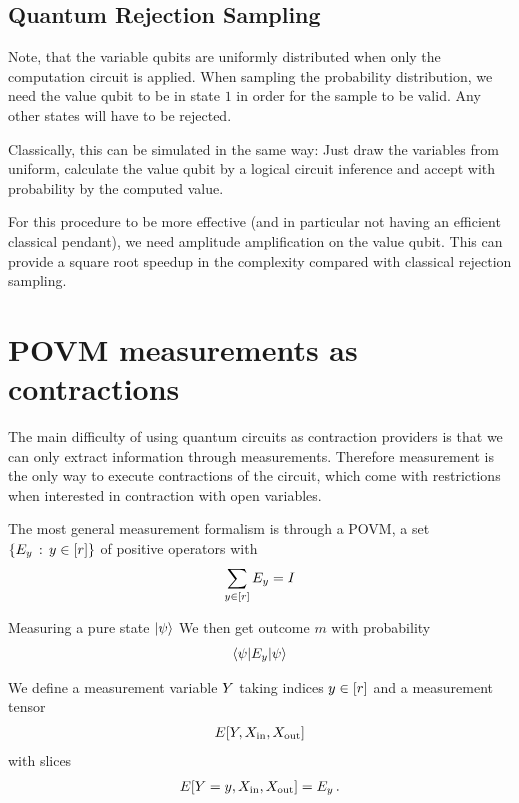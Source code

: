\documentclass[aps,onecolumn,nofootinbib,pra]{article}
\begin{document}
    \subsection{Quantum Rejection Sampling}

    Note, that the variable qubits are uniformly distributed when only the computation circuit is applied.
    When sampling the probability distribution, we need the value qubit to be in state $1$ in order for the sample to be valid.
    Any other states will have to be rejected.

    Classically, this can be simulated in the same way: Just draw the variables from uniform, calculate the value qubit by a logical circuit inference and accept with probability by the computed value.

    For this procedure to be more effective (and in particular not having an efficient classical pendant), we need amplitude amplification on the value qubit.
    This can provide a square root speedup in the complexity compared with classical rejection sampling.


    \section{POVM measurements as contractions}

    The main difficulty of using quantum circuits as contraction providers is that we can only extract information through measurements.
    Therefore measurement is the only way to execute contractions of the circuit, which come with restrictions when interested in contraction with open variables.

    The most general measurement formalism is through a POVM, a set $\{E_y \, : \, y\in[r]\}$ of positive operators with %
    \begin{align*}
        \sum_{y\in[r]} E_y = I
    \end{align*}

    Measuring a pure state $\ket{\psi}$ We then get outcome $m$ with probability
    \begin{align*}
        \braket{\psi|E_y|\psi}
    \end{align*}

    We define a measurement variable $Y$ taking indices $y\in[r]$ and a measurement tensor
    \begin{align*}
        E[Y,X_{\mathrm{in}},X_{\mathrm{out}}]
    \end{align*}
    with slices
    \begin{align*}
        E[Y=y,X_{\mathrm{in}},X_{\mathrm{out}}] = E_y \, .
    \end{align*}
\end{document}
